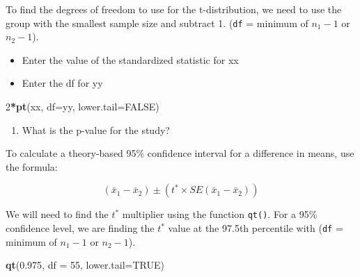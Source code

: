 \documentclass[
]{report}
\newenvironment{Shaded}{\begin{snugshade}}{\end{snugshade}}
\newcommand{\AttributeTok}[1]{\textcolor[rgb]{0.13,0.29,0.53}{#1}}
\newcommand{\ConstantTok}[1]{\textcolor[rgb]{0.56,0.35,0.01}{#1}}
\newcommand{\DecValTok}[1]{\textcolor[rgb]{0.00,0.00,0.81}{#1}}
\newcommand{\FloatTok}[1]{\textcolor[rgb]{0.00,0.00,0.81}{#1}}
\newcommand{\FunctionTok}[1]{\textcolor[rgb]{0.13,0.29,0.53}{\textbf{#1}}}
\newcommand{\NormalTok}[1]{#1}
\newcommand{\SpecialCharTok}[1]{\textcolor[rgb]{0.81,0.36,0.00}{\textbf{#1}}}
\providecommand{\tightlist}{%
  \setlength{\itemsep}{0pt}\setlength{\parskip}{0pt}}
\begin{document}
\vspace{0.5in}

To find the degrees of freedom to use for the t-distribution, we need to use the group with the smallest sample size and subtract 1. (\texttt{df} = minimum of \(n_1 - 1\) or \(n_2 - 1\)).

\vspace{0.2in}

\begin{itemize}
\item
  Enter the value of the standardized statistic for xx
\item
  Enter the df for yy
\end{itemize}

\begin{Shaded}
\begin{Highlighting}[]
\DecValTok{2}\SpecialCharTok{*}\FunctionTok{pt}\NormalTok{(xx, }\AttributeTok{df=}\NormalTok{yy, }\AttributeTok{lower.tail=}\ConstantTok{FALSE}\NormalTok{)}
\end{Highlighting}
\end{Shaded}

\vspace{0.3in}

\begin{enumerate}
\def\labelenumi{\arabic{enumi}.}
\setcounter{enumi}{7}
\tightlist
\item
  What is the p-value for the study?
\end{enumerate}

\vspace{0.2in}

To calculate a theory-based 95\% confidence interval for a difference in means, use the formula:

\[(\bar{x}_1- \bar{x}_2)\pm (t^* \times SE(\bar{x}_1- \bar{x}_2))\]

We will need to find the \(t^*\) multiplier using the function \texttt{qt()}. For a 95\% confidence level, we are finding the \(t^*\) value at the 97.5th percentile with (\texttt{df} = minimum of \(n_1 - 1\) or \(n_2 - 1\)).

\begin{Shaded}
\begin{Highlighting}[]
\FunctionTok{qt}\NormalTok{(}\FloatTok{0.975}\NormalTok{, }\AttributeTok{df =} \DecValTok{55}\NormalTok{, }\AttributeTok{lower.tail=}\ConstantTok{TRUE}\NormalTok{)}
\end{Highlighting}
\end{Shaded}
\end{document}
